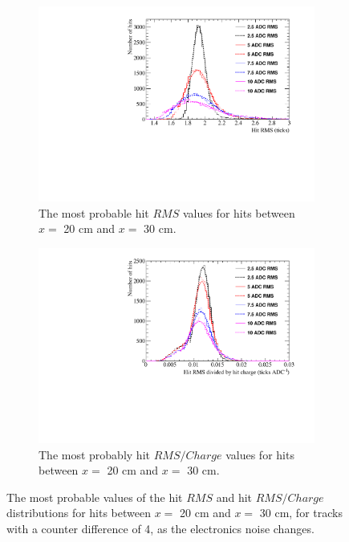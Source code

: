 \begin{figure}
  \centering
  \begin{subfigure}{0.48\textwidth}
    \centering
    \includegraphics[width=\textwidth]{Canvas_RMS_20cm_NoiseLevel}
    \caption{The most probable hit $RMS$ values for hits between $x =$ 20 cm and $x =$ 30 cm.}
  \end{subfigure}%
  \hspace{0.03\textwidth}%
  \begin{subfigure}{0.48\textwidth}
    \centering
    \includegraphics[width=\textwidth]{Canvas_RMS_Q_20cm_NoiseLevel}
    \caption{The most probably hit $RMS/Charge$ values for hits between $x =$ 20 cm and $x =$ 30 cm.}
  \end{subfigure}
  \caption[The most probable values of the hit $RMS$ and hit $RMS/Charge$ distributions for tracks with a counter difference of 4, as the electronics noise changes]
          {The most probable values of the hit $RMS$ and hit $RMS/Charge$ distributions for hits between $x =$ 20 cm and $x =$ 30 cm, for tracks with a counter difference of 4, as the electronics noise changes.}
  \label{fig:DiffNoiseStudy_HitFit}
\end{figure}

